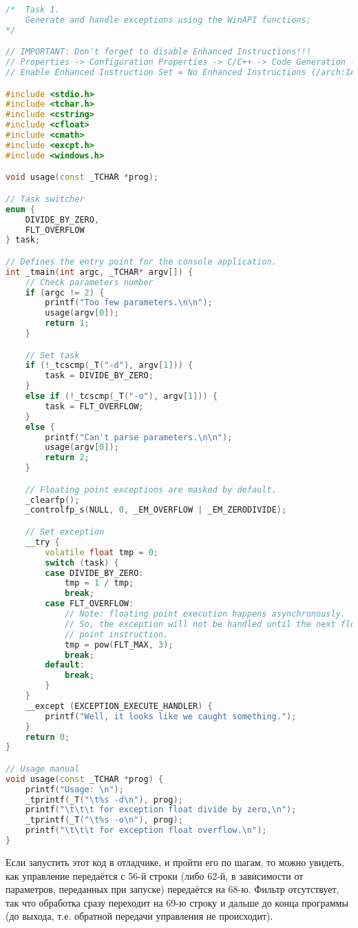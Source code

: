 \documentclass[a4paper,12pt]{article} %
\begin{document}
\begin{lstlisting}[language=C++, caption={Генерация и обработка исключения с помощью функций WinAPI}]
/*  Task 1.
	Generate and handle exceptions using the WinAPI functions;
*/

// IMPORTANT: Don't forget to disable Enhanced Instructions!!!
// Properties -> Configuration Properties -> C/C++ -> Code Generation ->
// Enable Enhanced Instruction Set = No Enhanced Instructions (/arch:IA32)

#include <stdio.h>
#include <tchar.h>
#include <cstring>
#include <cfloat>
#include <cmath>
#include <excpt.h>
#include <windows.h>

void usage(const _TCHAR *prog);

// Task switcher
enum {
	DIVIDE_BY_ZERO,
	FLT_OVERFLOW
} task;

// Defines the entry point for the console application.
int _tmain(int argc, _TCHAR* argv[]) {
	// Check parameters number
	if (argc != 2) {
		printf("Too few parameters.\n\n");
		usage(argv[0]);
		return 1;
	}

	// Set task
	if (!_tcscmp(_T("-d"), argv[1])) {
		task = DIVIDE_BY_ZERO;
	}
	else if (!_tcscmp(_T("-o"), argv[1])) {
		task = FLT_OVERFLOW;
	}
	else {
		printf("Can't parse parameters.\n\n");
		usage(argv[0]);
		return 2;
	}

	// Floating point exceptions are masked by default.
	_clearfp();
	_controlfp_s(NULL, 0, _EM_OVERFLOW | _EM_ZERODIVIDE);

	// Set exception
	__try {
		volatile float tmp = 0;
		switch (task) {
		case DIVIDE_BY_ZERO:
			tmp = 1 / tmp;
			break;
		case FLT_OVERFLOW:
			// Note: floating point execution happens asynchronously.
			// So, the exception will not be handled until the next floating
			// point instruction.
			tmp = pow(FLT_MAX, 3);
			break;
		default:
			break;
		}
	}
	__except (EXCEPTION_EXECUTE_HANDLER) {
		printf("Well, it looks like we caught something.");
	}
	return 0;
}

// Usage manual
void usage(const _TCHAR *prog) {
	printf("Usage: \n");
	_tprintf(_T("\t%s -d\n"), prog);
	printf("\t\t\t for exception float divide by zero,\n");
	_tprintf(_T("\t%s -o\n"), prog);
	printf("\t\t\t for exception float overflow.\n");
}
\end{lstlisting}
Если запустить этот код в отладчике, и пройти его по шагам, то можно увидеть, как управление передаётся с 56-й строки (либо 62-й, в зависимости от параметров, переданных при запуске) передаётся на 68-ю. Фильтр отсутствует, так что обработка сразу переходит на 69-ю строку и дальше до конца программы (до выхода, т.е. обратной передачи управления не происходит). 
\newpage
\end{document}

